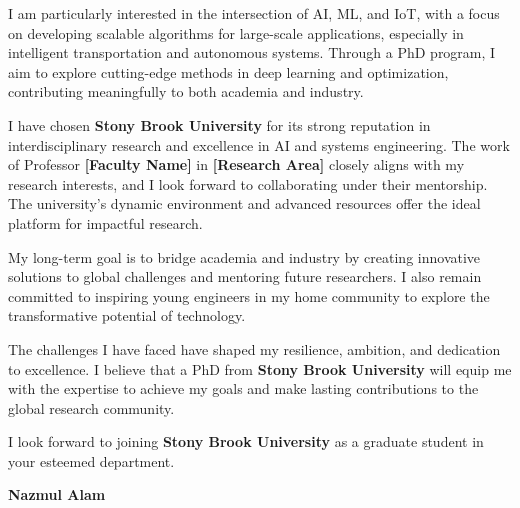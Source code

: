 \documentclass[11pt]{article}
\newif\ifshowsections
\begin{document}
I am particularly interested in the intersection of AI, ML, and IoT, with a focus on developing scalable algorithms
for large-scale applications, especially in intelligent transportation and autonomous systems. Through a PhD program,
I aim to explore cutting-edge methods in deep learning and optimization, contributing meaningfully to both academia
and industry.

\ifshowsections\section*{Motivation and Future Goals}\fi

I have chosen \textbf{Stony Brook University} for its strong reputation in interdisciplinary research and excellence
in AI and systems engineering. The work of Professor \textbf{[Faculty Name]} in \textbf{[Research Area]} closely aligns
with my research interests, and I look forward to collaborating under their mentorship. The university’s dynamic
environment and advanced resources offer the ideal platform for impactful research.

My long-term goal is to bridge academia and industry by creating innovative solutions to global challenges and
mentoring future researchers. I also remain committed to inspiring young engineers in my home community to explore
the transformative potential of technology.

\ifshowsections\section*{Conclusion}\fi

The challenges I have faced have shaped my resilience, ambition, and dedication to excellence. I believe that a
PhD from \textbf{Stony Brook University} will equip me with the expertise to achieve my goals and make lasting
contributions to the global research community.

I look forward to joining \textbf{Stony Brook University} as a graduate student in your esteemed department.

\begin{flushleft}
    \vspace{1.5em}
    \textbf{Nazmul Alam}
\end{flushleft}
\end{document}
